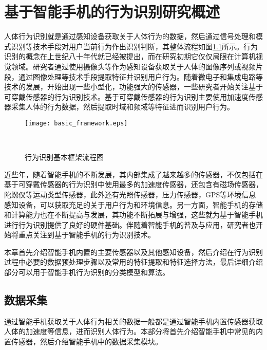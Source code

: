 \chapter{基于智能手机的行为识别研究概述}
\par 人体行为识别就是通过感知设备获取关于人体行为的数据，然后通过信号处理和模式识别等技术手段对用户当前行为作出识别判断，其整体流程如图\ref{basic_framework}所示。行为识别的概念在上世纪八十年代就已经被提出，而在研究初期它仅仅局限在计算机视觉领域。研究者通过使用摄像头等作为感知设备获取关于人体的图像序列或视频片段，通过图像处理等技术手段提取特征并识别用户行为。随着微电子和集成电路等技术的发展，开始出现一些小型化，功能强大的传感器，一些研究者开始关注基于可穿戴传感器的行为识别技术。基于可穿戴传感器的行为识别主要使用加速度传感器采集人体的行为数据，然后提取时域和频域等特征进而识别用户行为。

\begin{figure}[htb]
\centering
\texttt{[image: basic\_framework.eps]}
\caption{行为识别基本框架流程图}　\label{basic_framework}
\end{figure}

\par 近些年，随着智能手机的不断发展，其内部集成了越来越多的传感器，不仅包括在基于可穿戴传感器的行为识别中使用最多的加速度传感器，还包含有磁场传感器，陀螺仪等运动类型传感器，此外还有光照传感器，压力传感器，GPS等环境信息感知设备，可以获取充足的关于用户行为和环境信息。另一方面，智能手机的存储和计算能力也在不断提高与发展，其功能不断拓展与增强，这些就为基于智能手机进行行为识别提供了良好的硬件基础。伴随着智能手机的普及与应用，研究者也开始将重点关注到基于智能手机的行为识别技术。
\par 本章首先介绍智能手机内置的主要传感器以及其他感知设备，然后介绍在行为识别过程中必要的数据预处理步骤以及常用的特征提取和特征选择方法，最后详细介绍部分可以用于智能手机行为识别的分类模型和算法。

\section{数据采集}
\par 通过智能手机获取关于人体行为相关的数据一般都是通过智能手机内置传感器获取人体的加速度等信息，进而识别人体行为。本部分将首先介绍智能手机中常见的内置传感器，然后介绍智能手机中的数据采集模块。
